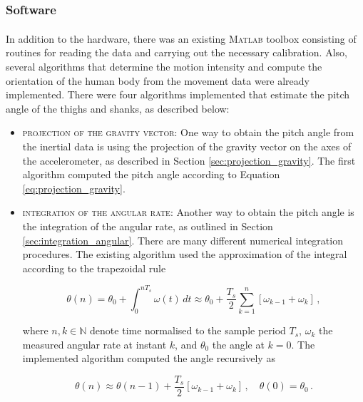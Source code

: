 \subsubsection{Software}

In addition to the hardware, there was an existing \textsc{Matlab}\textsuperscript{\textregistered} toolbox consisting of routines for reading the data and carrying out the necessary calibration. Also, several algorithms that determine the motion intensity and compute the orientation of the human body from the movement data were already implemented. There were four algorithms implemented that estimate the pitch angle of the thighs and shanks, as described below:

\begin{itemize}
  \item \textsc{projection of the gravity vector:} One way to obtain the pitch angle from the inertial data is using the projection of the gravity vector on the axes of the accelerometer, as described in Section \ref{sec:projection_gravity}. The first algorithm computed the pitch angle according to Equation \ref{eq:projection_gravity}.
  
  \item \textsc{integration of the angular rate:} Another way to obtain the pitch angle is the integration of the angular rate, as outlined in Section \ref{sec:integration_angular}. There are many different numerical integration procedures. The existing algorithm used the approximation of the integral according to the trapezoidal rule
  
  \begin{equation}
   \theta(n) = \theta_0 + \int_{0}^{n T_s} \omega(t)\, dt \approx \theta_0 + \frac{T_s}{2} \sum_{k=1}^{n} \left[ \omega_{k-1} + \omega_{k} \right]\,,
  \end{equation}
  
  \noindent
  where $n, k \in \mathbb{N}$ denote time normalised to the sample period $T_s$, $\omega_k$ the measured angular rate at instant $k$, and $\theta_0$ the angle at $k=0$. The implemented algorithm computed the angle recursively as
  
   \begin{equation}
   \theta(n) \approx \theta(n-1) + \frac{T_s}{2} \left[ \omega_{k-1} + \omega_{k} \right]\,, \quad \theta(0) = \theta_{0}\,.
  \end{equation}
  

\end{itemize}
